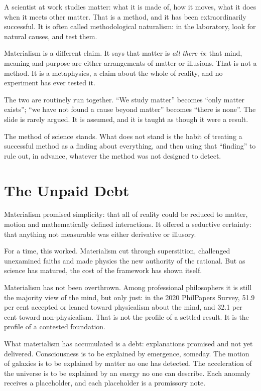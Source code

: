 \documentclass[11pt,a4paper]{article}
\begin{document}
A scientist at work studies matter: what it is made of, how it moves, what it does when it meets other matter. That is a method, and it has been extraordinarily successful. It is often called methodological naturalism: in the laboratory, look for natural causes, and test them.

Materialism is a different claim. It says that matter is \emph{all there is}: that mind, meaning and purpose are either arrangements of matter or illusions. That is not a method. It is a metaphysics, a claim about the whole of reality, and no experiment has ever tested it.

The two are routinely run together. ``We study matter'' becomes ``only matter exists''; ``we have not found a cause beyond matter'' becomes ``there is none''. The slide is rarely argued. It is assumed, and it is taught as though it were a result.

 The method of science stands. What does not stand is the habit of treating a successful method as a finding about everything, and then using that ``finding'' to rule out, in advance, whatever the method was not designed to detect.

\section{The Unpaid Debt}
\label{sec:debt}

Materialism promised simplicity: that all of reality could be reduced to matter, motion and mathematically defined interactions. It offered a seductive certainty: that anything not measurable was either derivative or illusory.

For a time, this worked. Materialism cut through superstition, challenged unexamined faiths and made physics the new authority of the rational. But as science has matured, the cost of the framework has shown itself.

Materialism has not been overthrown. Among professional philosophers it is still the majority view of the mind, but only just: in the 2020 PhilPapers Survey, 51.9 per cent accepted or leaned toward physicalism about the mind, and 32.1 per cent toward non-physicalism. That is not the profile of a settled result. It is the profile of a contested foundation.

What materialism has accumulated is a debt: explanations promised and not yet delivered. Consciousness is to be explained by emergence, someday. The motion of galaxies is to be explained by matter no one has detected. The acceleration of the universe is to be explained by an energy no one can describe. Each anomaly receives a placeholder, and each placeholder is a promissory note.
\end{document}
